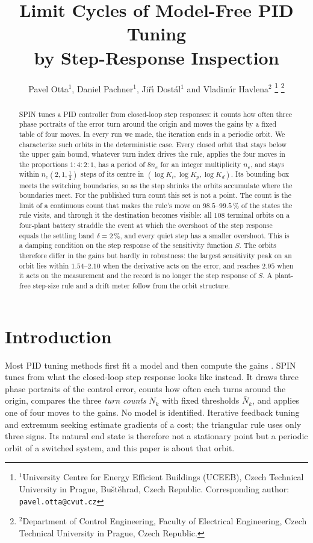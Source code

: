\documentclass[letterpaper, 10 pt, conference]{ieeeconf}
\title{\LARGE\bf Limit Cycles of Model-Free PID Tuning\\ by Step-Response Inspection}
\author{Pavel Otta$^{1}$, Daniel Pachner$^{1}$, Ji\v{r}\'{\i} Dost\'al$^{1}$
and Vladim\'{\i}r Havlena$^{2}$%
\thanks{$^{1}$University Centre for Energy Efficient Buildings (UCEEB),
Czech Technical University in Prague, Bu\v{s}t\v{e}hrad, Czech Republic.
Corresponding author: {\tt pavel.otta@cvut.cz}}%
\thanks{$^{2}$Department of Control Engineering, Faculty of Electrical
Engineering, Czech Technical University in Prague, Czech Republic.}%
}
\newcommand{\Nbar}{\bar{N}}
\newcommand{\spin}{SPIN}
\begin{document}
\maketitle
\thispagestyle{empty}
\pagestyle{empty}

\begin{abstract}
\spin{} tunes a PID controller from closed-loop step responses: it counts
how often three phase portraits of the error turn around the origin and
moves the gains by a fixed table of four moves. In every run we made, the
iteration ends in a periodic orbit. We characterize such orbits in the
deterministic case. Every closed orbit that stays below the upper gain
bound, whatever turn index drives the rule, applies the four moves in the
proportions $1\!:\!4\!:\!2\!:\!1$, has a period of $8 n_e$ for an integer
multiplicity $n_e$, and stays within $n_e (2, 1, \tfrac12)$ steps of its
centre in $(\log K_i, \log K_p, \log K_d)$. Its bounding box meets the
switching boundaries, so as the step shrinks the orbits accumulate where the
boundaries meet. For the published turn count this set is not a point. The
count is the limit of a continuous count that makes the rule's move on
$98.5$--$99.5\,\%$ of the states the rule visits, and through it the
destination becomes visible: all $108$ terminal orbits on a four-plant
battery straddle the event at which the overshoot of the step response
equals the settling band $\delta = 2\,\%$, and every quiet step has a smaller
overshoot. This is a damping condition on the step response of the
sensitivity function $S$. The orbits therefore differ in the gains but
hardly in robustness: the largest sensitivity peak on an orbit lies within
$1.54$--$2.10$ when the derivative acts on the error, and reaches $2.95$ when it
acts on the measurement and the record is no longer the step response of $S$.
A plant-free step-size rule and a drift meter follow from the orbit structure.
\end{abstract}

\section{Introduction}

Most PID tuning methods first fit a model and then compute the gains
\cite{ZN1942,AstromHagglund2004}. \spin{} \cite{Paper1} tunes from what the
closed-loop step response looks like instead. It draws three phase portraits
of the control error, counts how often each turns around the origin, compares
the three \emph{turn counts} $N_k$ with fixed thresholds $\Nbar_k$, and applies
one of four moves to the gains. No model is identified. Iterative feedback
tuning \cite{Hjalmarsson1998} and extremum seeking \cite{Killingsworth2006}
estimate gradients of a cost; the triangular rule uses only three signs.
Its natural end state is therefore not a stationary point but a periodic
orbit of a switched system, and this paper is about that orbit.
\end{document}
